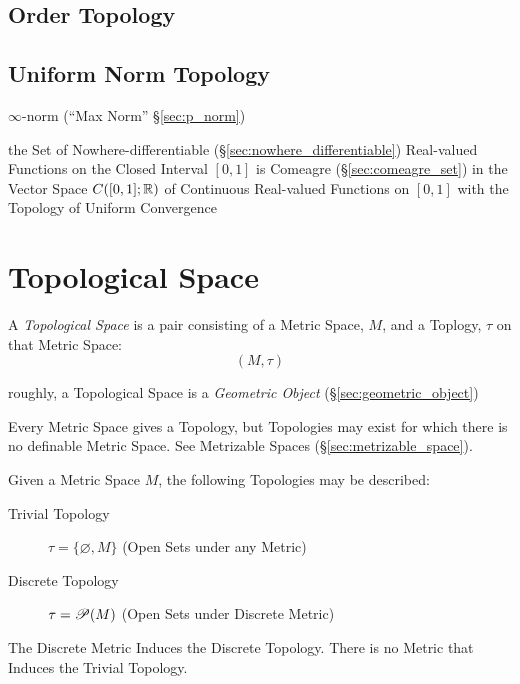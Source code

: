 \subsection{Order Topology}\label{sec:order_topology}

\subsection{Uniform Norm Topology}\label{sec:uniform_norm_topology}

$\infty$-norm (``Max Norm'' \S\ref{sec:p_norm})

the Set of Nowhere-differentiable (\S\ref{sec:nowhere_differentiable})
Real-valued Functions on the Closed Interval $[0,1]$ is Comeagre
(\S\ref{sec:comeagre_set}) in the Vector Space $C([0,1]; \mathbb{R})$ of Continuous
Real-valued Functions on $[0,1]$ with the Topology of Uniform Convergence



\section{Topological Space}\label{sec:topological_space}

A \emph{Topological Space} is a pair consisting of a Metric Space, $M$, and a
Toplogy, $\tau$ on that Metric Space:
\[
  (M,\tau)
\]

roughly, a Topological Space is a \emph{Geometric Object}
(\S\ref{sec:geometric_object})

Every Metric Space gives a Topology, but Topologies may exist for which there is
no definable Metric Space. See Metrizable Spaces (\S\ref{sec:metrizable_space}).

Given a Metric Space $M$, the following Topologies may be described:
\begin{description}
\item[Trivial Topology] $\tau = \{\varnothing, M\}$ (Open Sets under
  any Metric)

\item[Discrete Topology] $\tau = \mathscr{P}(M)$ (Open Sets under
  Discrete Metric)
\end{description}
The Discrete Metric Induces the Discrete Topology. There is no Metric
that Induces the Trivial Topology.

